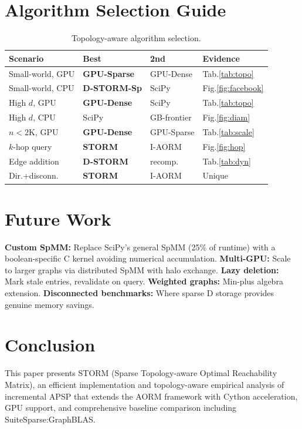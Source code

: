 \documentclass[journal]{IEEEtran}
\begin{document}
\section{Algorithm Selection Guide}

\begin{table}[t]
\centering
\caption{Topology-aware algorithm selection.}
\label{tab:guide}
\setlength{\tabcolsep}{2pt}
\begin{tabular}{@{}lllp{2cm}@{}}
\toprule
\textbf{Scenario} & \textbf{Best} & \textbf{2nd} & \textbf{Evidence} \\
\midrule
Small-world, GPU & \textbf{GPU-Sparse} & GPU-Dense & Tab.\ref{tab:topo} \\
Small-world, CPU & \textbf{D-STORM-Sp} & SciPy & Fig.\ref{fig:facebook} \\
High $d$, GPU & \textbf{GPU-Dense} & SciPy & Tab.\ref{tab:topo} \\
High $d$, CPU & SciPy & GB-frontier & Fig.\ref{fig:diam} \\
$n < 2$K, GPU & \textbf{GPU-Dense} & GPU-Sparse & Tab.\ref{tab:scale} \\
$k$-hop query & \textbf{STORM} & I-AORM & Fig.\ref{fig:hop} \\
Edge addition & \textbf{D-STORM} & recomp. & Tab.\ref{tab:dyn} \\
Dir.+disconn. & \textbf{STORM} & I-AORM & Unique \\
\bottomrule
\end{tabular}
\end{table}


\section{Future Work}

\textbf{Custom SpMM:} Replace SciPy's general SpMM (25\% of runtime) with a boolean-specific C kernel avoiding numerical accumulation. \textbf{Multi-GPU:} Scale to larger graphs via distributed SpMM with halo exchange. \textbf{Lazy deletion:} Mark stale entries, revalidate on query. \textbf{Weighted graphs:} Min-plus algebra extension. \textbf{Disconnected benchmarks:} Where sparse D storage provides genuine memory savings.


\section{Conclusion}

This paper presents STORM (Sparse Topology-aware Optimal Reachability Matrix), an efficient implementation and topology-aware empirical analysis of incremental APSP that extends the AORM framework with Cython acceleration, GPU support, and comprehensive baseline comparison including SuiteSparse:GraphBLAS.
\end{document}
